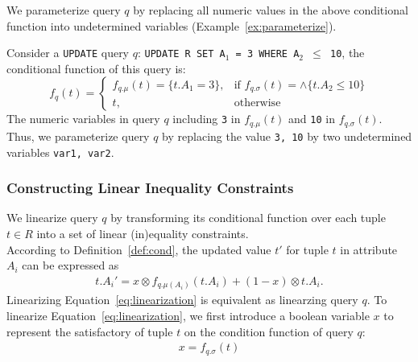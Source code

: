 \smallskip

We parameterize query $q$ by replacing 
 all numeric values 
in the above conditional function into
undetermined variables (Example~\ref{ex:parameterize}).
\begin{example}\label{ex:parameterize}
Consider a \texttt{UPDATE} query $q$:
\texttt{UPDATE R SET A$_1$ = 3 WHERE A$_2$ $\leq$ 10},
the conditional function of this query is: 
\[
    f_q(t)= 
\begin{cases}
    f_{q.\mu}(t) = \{t.A_1 = 3\} ,& \text{if } f_{q.\sigma}(t) = \wedge\{t.A_2 \leq 10\}\\
    t,              & \text{otherwise}
\end{cases}
\]
The numeric variables in query $q$ including \texttt{3} in $f_{q.\mu}(t)$ and \texttt{10}
in $f_{q.\sigma}(t)$. Thus, we parameterize query $q$ by replacing the value \texttt{3, 10}
by two undetermined variables \texttt{var1, var2}. 
\end{example} 
\subsubsection{Constructing Linear Inequality Constraints}
We linearize query $q$ by transforming its conditional function 
over each tuple $t\in R$ into a set of linear (in)equality constraints. \\
According to Definition~\ref{def:cond}, 
the updated value $t'$ for tuple $t$ in attribute $A_i$ can be expressed as  
\begin{eqnarray}
\label{eq:linearization}
t.A_i' = x\otimes f_{q.\mu(A_i)} (t.A_i) + (1-x)\otimes t.A_i. 
\end{eqnarray} 
Linearizing Equation~\ref{eq:linearization} is equivalent as linearzing
query $q$.  
To linearize Equation~\ref{eq:linearization}, 
we first introduce a boolean variable $x$ to represent the satisfactory 
of tuple $t$ on the condition function of query $q$:
\begin{eqnarray}
\label{eq:x}
x = f_{q.\sigma}(t)
\end{eqnarray}

